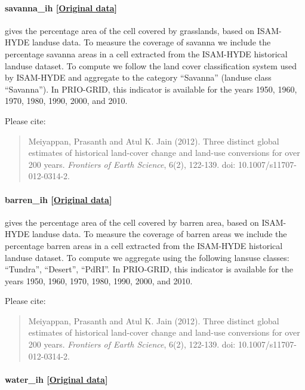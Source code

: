 \documentclass[]{book}
\begin{document}
\paragraph{savanna\_ih
{[}\href{https://www.atmos.illinois.edu/~meiyapp2/datasets.htm}{Original
data}{]}}\label{savanna-ih}

gives the percentage area of the cell covered by grasslands, based on
ISAM-HYDE landuse data. To measure the coverage of savanna we include
the percentage savanna areas in a cell extracted from the ISAM-HYDE
historical landuse dataset. To compute  we follow
the land cover classification system used by ISAM-HYDE and aggregate to
the category ``Savanna'' (landuse class ``Savanna''). In PRIO-GRID, this
indicator is available for the years 1950, 1960, 1970, 1980, 1990, 2000,
and 2010.

Please cite:

\begin{quote}
Meiyappan, Prasanth and Atul K. Jain (2012). Three distinct global
estimates of historical land-cover change and land-use conversions for
over 200 years. \emph{Frontiers of Earth Science}, 6(2), 122-139. doi:
10.1007/s11707-012-0314-2.
\end{quote}

\paragraph{barren\_ih
{[}\href{https://www.atmos.illinois.edu/~meiyapp2/datasets.htm}{Original
data}{]}}\label{barren-ih}

gives the percentage area of the cell covered by barren area, based on
ISAM-HYDE landuse data. To measure the coverage of barren areas we
include the percentage barren areas in a cell extracted from the
ISAM-HYDE historical landuse dataset. To compute  we
aggregate using the following lansuse classes: ``Tundra'', ``Desert'',
``PdRI''. In PRIO-GRID, this indicator is available for the years 1950,
1960, 1970, 1980, 1990, 2000, and 2010.

Please cite:

\begin{quote}
Meiyappan, Prasanth and Atul K. Jain (2012). Three distinct global
estimates of historical land-cover change and land-use conversions for
over 200 years. \emph{Frontiers of Earth Science}, 6(2), 122-139. doi:
10.1007/s11707-012-0314-2.
\end{quote}

\paragraph{water\_ih
{[}\href{https://www.atmos.illinois.edu/~meiyapp2/datasets.htm}{Original
data}{]}}\label{water-ih}
\end{document}
